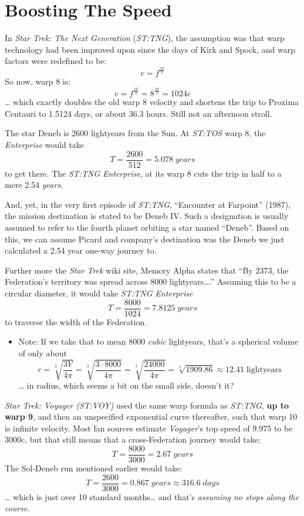 \documentclass[
  letterpaper,
]{book}
\providecommand{\tightlist}{%
  \setlength{\itemsep}{0pt}\setlength{\parskip}{0pt}}
\begin{document}
\section{Boosting The Speed}\label{boosting-the-speed}

In \emph{Star Trek: The Next Generation} (\emph{ST:TNG}), the assumption
was that warp technology had been improved upon since the days of Kirk
and Spock, and warp factors were redefined to be: \[
v = f^\frac{10}{3}
\] So now, warp 8 is: \[
v = f^\frac{10}{3} = 8^\frac{10}{3} = 1024c
\] \ldots{} which exactly doubles the old warp 8 velocity and shortens
the trip to Proxima Centauri to 1.5124 days, or about 36.3 hours. Still
not an afternoon stroll.

The star Deneb is 2600 lightyears from the Sun. At \emph{ST:TOS} warp 8,
the \emph{Enterprise} would take \[
T = \frac{2600}{512} = 5.078\; \textit{years}
\] to get there. The \emph{ST:TNG} \emph{Enterprise}, at its warp 8 cuts
the trip in half to a mere 2.54 \emph{years}.

And, yet, in the very first episode of \emph{ST:TNG}, ``Encounter at
Farpoint'' (1987), the mission destination is stated to be Deneb IV.
Such a designation is usually assumed to refer to the fourth planet
orbiting a star named ``Deneb''. Based on this, we can assume Picard and
company's destination was the Deneb we just calculated a 2.54 year
one-way journey to.

Further more the \emph{Star Trek} wiki site, Memory Alpha states that
``By 2373, the Federation's territory was spread across 8000
lightyears\ldots.'' Assuming this to be a circular diameter, it would
take \emph{ST:TNG Enterprise} \[
T = \frac{8000}{1024} = 7.8125\; \textit{years}
\] to traverse the width of the Federation.

\begin{itemize}
\tightlist
\item
  Note: If we take that to mean 8000 \emph{cubic} lightyears, that's a
  spherical volume of only about \[
  r = \sqrt[3]{\frac{3V}{4\pi}} = \sqrt[3]{\frac{3\cdot8000}{4\pi}} = \sqrt[3]{\frac{24000}{4\pi}} = \sqrt[3]{1909.86} ≈ 12.41\; \text{lightyears}
  \] \ldots{} in radius, which seems a bit on the small side, doesn't
  it?
\end{itemize}

\emph{Star Trek: Voyager (ST:VOY)} used the same warp formula as
\emph{ST:TNG}, \textbf{up to warp 9}, and then an unspecified
exponential curve thereafter, such that warp 10 is infinite velocity.
Most fan sources estimate \emph{Voyager}'s top speed of 9.975 to be
3000c, but that still means that a cross-Federation journey would take:
\[
T = \frac{8000}{3000} = 2.67\; \textit{years}
\] The Sol-Deneb run mentioned earlier would take: \[
T = \frac{2600}{3000} = 0.867\; \textit{years} ≈ 316.6\; \textit{days}
\] \ldots{} which is just over 10 standard months\ldots{} and that's
\emph{assuming no stops along the course}.
\end{document}
